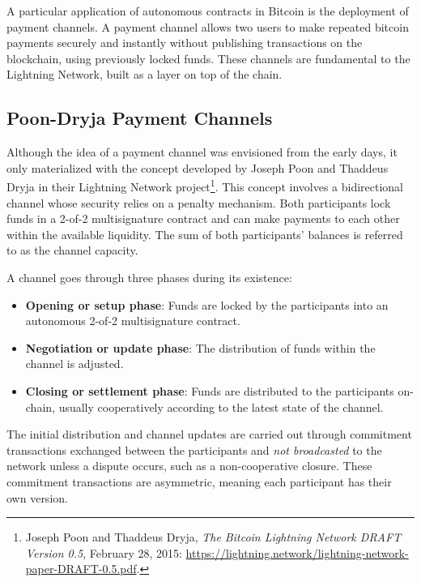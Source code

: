 \documentclass[
  a5paper,
  smalldemyvopaper,10pt,twoside,onecolumn,openright,extrafontsizes,hidelinks]{memoir}
\begin{document}

A particular application of autonomous contracts in Bitcoin is the
deployment of payment channels. A payment channel allows two users to
make repeated bitcoin payments securely and instantly without publishing
transactions on the blockchain, using previously locked funds. These
channels are fundamental to the Lightning Network, built as a layer on
top of the chain.

\subsection{Poon-Dryja Payment
Channels}\label{poon-dryja-payment-channels}

Although the idea of a payment channel was envisioned from the early
days, it only materialized with the concept developed by Joseph Poon and
Thaddeus Dryja in their Lightning Network project\footnote{Joseph Poon
  and Thaddeus Dryja, \emph{The Bitcoin Lightning Network DRAFT Version
  0.5}, February 28, 2015:
  \url{https://lightning.network/lightning-network-paper-DRAFT-0.5.pdf}.}.
This concept involves a bidirectional channel whose security relies on a
penalty mechanism. Both participants lock funds in a 2-of-2
multisignature contract and can make payments to each other within the
available liquidity. The sum of both participants' balances is referred
to as the channel capacity.

A channel goes through three phases during its existence:

\begin{itemize}
\item
  \textbf{Opening or setup phase}: Funds are locked by the participants
  into an autonomous 2-of-2 multisignature contract.
\item
  \textbf{Negotiation or update phase}: The distribution of funds within
  the channel is adjusted.
\item
  \textbf{Closing or settlement phase}: Funds are distributed to the
  participants on-chain, usually cooperatively according to the latest
  state of the channel.
\end{itemize}

The initial distribution and channel updates are carried out through
commitment transactions exchanged between the participants and \emph{not
broadcasted} to the network unless a dispute occurs, such as a
non-cooperative closure. These commitment transactions are asymmetric,
meaning each participant has their own version.
\end{document}
